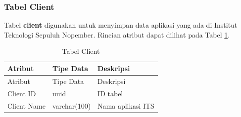 \subsubsection{Tabel Client}
\par Tabel \textbf{client} digunakan untuk menyimpan data aplikasi yang ada di Institut Teknologi Sepuluh Nopember. Rincian atribut dapat dilihat pada Tabel \ref{tabel_client}.
\begin{longtable}{|p{2cm}|p{2.5cm}|p{4.5cm}|}
	\caption{Tabel Client} \label{tabel_client} \\ \hline
    \rowcolor{lightgray} {Atribut} & {Tipe Data} & {Deskripsi} \\ \hline
    \endfirsthead
    \hline
    \rowcolor{lightgray} {Atribut} & {Tipe Data} & {Deskripsi} \\ \hline
    \endhead
    Client ID & uuid & ID tabel \\ \hline
    Client Name & varchar(100) & Nama aplikasi ITS \\ \hline

\end{longtable}
